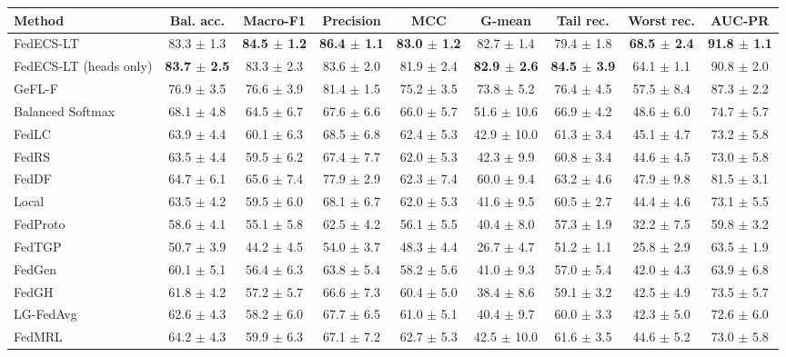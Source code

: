 \begin{tabular}{lcccccccc}
\toprule
Method & Bal. acc. & Macro-F1 & Precision & MCC & G-mean & Tail rec. & Worst rec. & AUC-PR\\
\midrule
FedECS-LT & 83.3 $\pm$ 1.3 & \textbf{84.5 $\pm$ 1.2} & \textbf{86.4 $\pm$ 1.1} & \textbf{83.0 $\pm$ 1.2} & 82.7 $\pm$ 1.4 & 79.4 $\pm$ 1.8 & \textbf{68.5 $\pm$ 2.4} & \textbf{91.8 $\pm$ 1.1}\\
FedECS-LT (heads only) & \textbf{83.7 $\pm$ 2.5} & 83.3 $\pm$ 2.3 & 83.6 $\pm$ 2.0 & 81.9 $\pm$ 2.4 & \textbf{82.9 $\pm$ 2.6} & \textbf{84.5 $\pm$ 3.9} & 64.1 $\pm$ 1.1 & 90.8 $\pm$ 2.0\\
GeFL-F & 76.9 $\pm$ 3.5 & 76.6 $\pm$ 3.9 & 81.4 $\pm$ 1.5 & 75.2 $\pm$ 3.5 & 73.8 $\pm$ 5.2 & 76.4 $\pm$ 4.5 & 57.5 $\pm$ 8.4 & 87.3 $\pm$ 2.2\\
Balanced Softmax & 68.1 $\pm$ 4.8 & 64.5 $\pm$ 6.7 & 67.6 $\pm$ 6.6 & 66.0 $\pm$ 5.7 & 51.6 $\pm$ 10.6 & 66.9 $\pm$ 4.2 & 48.6 $\pm$ 6.0 & 74.7 $\pm$ 5.7\\
FedLC & 63.9 $\pm$ 4.4 & 60.1 $\pm$ 6.3 & 68.5 $\pm$ 6.8 & 62.4 $\pm$ 5.3 & 42.9 $\pm$ 10.0 & 61.3 $\pm$ 3.4 & 45.1 $\pm$ 4.7 & 73.2 $\pm$ 5.8\\
FedRS & 63.5 $\pm$ 4.4 & 59.5 $\pm$ 6.2 & 67.4 $\pm$ 7.7 & 62.0 $\pm$ 5.3 & 42.3 $\pm$ 9.9 & 60.8 $\pm$ 3.4 & 44.6 $\pm$ 4.5 & 73.0 $\pm$ 5.8\\
FedDF & 64.7 $\pm$ 6.1 & 65.6 $\pm$ 7.4 & 77.9 $\pm$ 2.9 & 62.3 $\pm$ 7.4 & 60.0 $\pm$ 9.4 & 63.2 $\pm$ 4.6 & 47.9 $\pm$ 9.8 & 81.5 $\pm$ 3.1\\
Local & 63.5 $\pm$ 4.2 & 59.5 $\pm$ 6.0 & 68.1 $\pm$ 6.7 & 62.0 $\pm$ 5.3 & 41.6 $\pm$ 9.5 & 60.5 $\pm$ 2.7 & 44.4 $\pm$ 4.6 & 73.1 $\pm$ 5.5\\
FedProto & 58.6 $\pm$ 4.1 & 55.1 $\pm$ 5.8 & 62.5 $\pm$ 4.2 & 56.1 $\pm$ 5.5 & 40.4 $\pm$ 8.0 & 57.3 $\pm$ 1.9 & 32.2 $\pm$ 7.5 & 59.8 $\pm$ 3.2\\
FedTGP & 50.7 $\pm$ 3.9 & 44.2 $\pm$ 4.5 & 54.0 $\pm$ 3.7 & 48.3 $\pm$ 4.4 & 26.7 $\pm$ 4.7 & 51.2 $\pm$ 1.1 & 25.8 $\pm$ 2.9 & 63.5 $\pm$ 1.9\\
FedGen & 60.1 $\pm$ 5.1 & 56.4 $\pm$ 6.3 & 63.8 $\pm$ 5.4 & 58.2 $\pm$ 5.6 & 41.0 $\pm$ 9.3 & 57.0 $\pm$ 5.4 & 42.0 $\pm$ 4.3 & 63.9 $\pm$ 6.8\\
FedGH & 61.8 $\pm$ 4.2 & 57.2 $\pm$ 5.7 & 66.6 $\pm$ 7.3 & 60.4 $\pm$ 5.0 & 38.4 $\pm$ 8.6 & 59.1 $\pm$ 3.2 & 42.5 $\pm$ 4.9 & 73.5 $\pm$ 5.7\\
LG-FedAvg & 62.6 $\pm$ 4.3 & 58.2 $\pm$ 6.0 & 67.7 $\pm$ 6.5 & 61.0 $\pm$ 5.1 & 40.4 $\pm$ 9.7 & 60.0 $\pm$ 3.3 & 42.3 $\pm$ 5.0 & 72.6 $\pm$ 6.0\\
FedMRL & 64.2 $\pm$ 4.3 & 59.9 $\pm$ 6.3 & 67.1 $\pm$ 7.2 & 62.7 $\pm$ 5.3 & 42.5 $\pm$ 10.0 & 61.6 $\pm$ 3.5 & 44.6 $\pm$ 5.2 & 73.0 $\pm$ 5.8\\
\bottomrule
\end{tabular}
